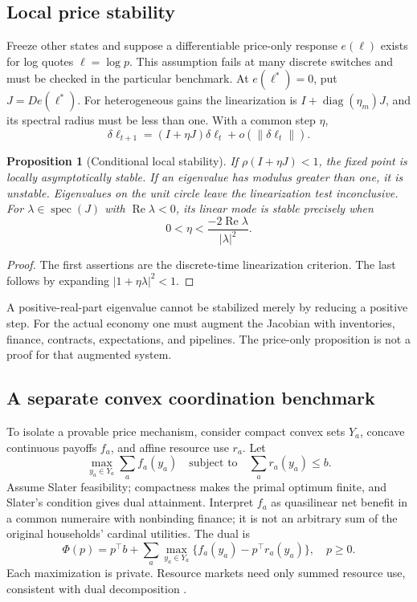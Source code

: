 \documentclass[10pt,a4paper,twocolumn]{article}
\newtheorem{proposition}{Proposition}
\newcommand{\norm}[1]{\left\|#1\right\|}
\begin{document}
\subsection{Local price stability}
Freeze other states and suppose a differentiable price-only response
$e(\ell)$ exists for log quotes $\ell=\log p$. This assumption fails at
many discrete switches and must be checked in the particular benchmark.
At $e(\ell^*)=0$, put $J=De(\ell^*)$. For heterogeneous gains the
linearization is $I+\operatorname{diag}(\eta_m)J$, and its spectral radius
must be less than one. With a common step $\eta$,
\begin{equation}
 \delta\ell_{t+1}=(I+\eta J)\delta\ell_t
 +o(\norm{\delta\ell_t}).
 \label{eq:linear}
\end{equation}
\begin{proposition}[Conditional local stability]
If $\rho(I+\eta J)<1$, the fixed point is locally asymptotically
stable. If an eigenvalue has modulus greater than one, it is unstable.
Eigenvalues on the unit circle leave the linearization test inconclusive.
For $\lambda\in\operatorname{spec}(J)$ with
$\operatorname{Re}\lambda<0$, its linear mode is stable precisely when
\begin{equation}
 0<\eta<\frac{-2\operatorname{Re}\lambda}{|\lambda|^2}.
\end{equation}
\end{proposition}
\begin{proof}
The first assertions are the discrete-time linearization criterion.
The last follows by expanding $|1+\eta\lambda|^2<1$.
\end{proof}
A positive-real-part eigenvalue cannot be stabilized merely by reducing
a positive step. For the actual economy one must augment the Jacobian
with inventories, finance, contracts, expectations, and pipelines. The
price-only proposition is not a proof for that augmented system.

\subsection{A separate convex coordination benchmark}
To isolate a provable price mechanism, consider compact convex sets
$Y_a$, concave continuous payoffs $f_a$, and affine resource use $r_a$.
Let
\begin{equation}
 \max_{y_a\in Y_a}\sum_a f_a(y_a)
 \quad\text{subject to}\quad\sum_a r_a(y_a)\leq b.
 \label{eq:benchmark}
\end{equation}
Assume Slater feasibility; compactness makes the primal optimum finite,
and Slater's condition gives dual attainment. Interpret $f_a$
as quasilinear net benefit in a common numeraire with nonbinding finance;
it is not an arbitrary sum of the original households' cardinal utilities.
The dual is
\begin{equation}
 \Phi(p)=p^\top b+
 \sum_a\max_{y_a\in Y_a}\{f_a(y_a)-p^\top r_a(y_a)\},
 \quad p\geq0.
\end{equation}
Each maximization is private. Resource markets need only summed resource
use, consistent with dual decomposition \cite{boyd2004,agrawal2022}.
\end{document}
